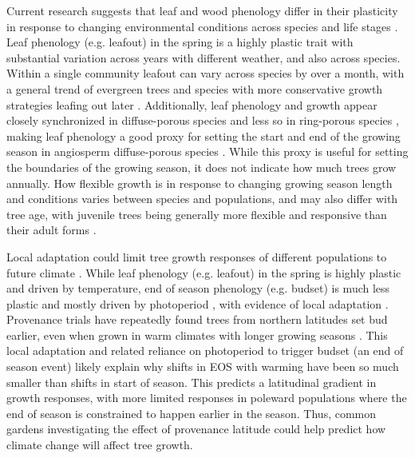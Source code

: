 Current research suggests that leaf and wood phenology differ in their plasticity in response to changing environmental conditions across species and life stages \citep{dox_wood_2022}. Leaf phenology (e.g. leafout) in the spring is a highly plastic trait with substantial variation across years with different weather, and also across species. Within a single community leafout can vary across species by over a month, with a general trend of evergreen trees and species with more conservative growth strategies leafing out later \citep{loughnan_budburst_2025}. Additionally, leaf phenology and growth appear closely synchronized in diffuse-porous species \citep[e.g., \textit{Betula;}][]{cufar_treering_2008} and less so in ring-porous species \citep[e.g., \textit{Oaks};][]{gonzalez-gonzalez_comparative_2013}, making leaf phenology a good proxy for setting the start and end of the growing season in angiosperm diffuse-porous species \citep{marchand_timing_2021,silvestro_roots_2025,suzuki_phenological_1996}. While this proxy is useful for setting the boundaries of the growing season, it does not indicate how much trees grow annually. How flexible growth is in response to changing growing season length and conditions varies between species and populations, and may also differ with tree age, with juvenile trees being generally more flexible and responsive than their adult forms \citep{augspurger_differences_2003,way_photoperiod_2015}. 

Local adaptation could limit tree growth responses of different populations to future climate \citep{soolanayakanahally_timing_2013,wolkovich_why_2025}. While leaf phenology (e.g. leafout) in the spring is highly plastic and driven by temperature, end of season phenology (e.g. budset) is much less plastic and mostly driven by photoperiod \citep{baumgarten_indeterminacy_2026,singh_photoperiod_2017}, with evidence of local adaptation \citep{zeng_weak_2024}. Provenance trials have repeatedly found trees from northern latitudes set bud earlier, even when grown in warm climates with longer growing seasons \citep{aitken_time_2016,way_photoperiod_2015}. This local adaptation and related reliance on photoperiod to trigger budset (an end of season event) likely explain why shifts in EOS with warming have been so much smaller than shifts in start of season. This predicts a latitudinal gradient in growth responses, with more limited responses in poleward populations where the end of season is constrained to happen earlier in the season. Thus, common gardens investigating the effect of provenance latitude could help predict how climate change will affect tree growth. 

